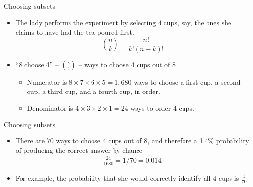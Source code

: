 \documentclass{beamer}
\begin{document}
\begin{frame}{Choosing subsets}
	
	\begin{itemize}
	\item The lady performs the experiment by selecting $4$ cups, say, the ones she claims to have had the tea poured first.
	 $${n \choose k} = \frac{n!}{k!(n-k)!}$$
	\item ``8 choose 4'' -- $ 8 \choose 4 $ -- ways to choose 4 cups out of 8
		
		\begin{itemize}
		\item Numerator is $8\times{7}\times{6}\times{5}=1,680$ ways to choose a first cup, a second cup, a third cup, and a fourth cup, in order.
		\item Denominator is $4\times{3}\times{2}\times{1}=24$ ways to order $4$ cups.
		\end{itemize}
	\end{itemize}
\end{frame}


\begin{frame}{Choosing subsets}

\begin{itemize}
	\item There are $70$ ways to choose $4$ cups out of $8$, and therefore a 1.4\% probability of producing the correct answer by chance
		\begin{eqnarray*}
		\frac{24}{1680}=1/70=0.014.
		\end{eqnarray*}
	\item For example, the probability that she would correctly identify all $4$ cups is $\frac{1}{70}$ 
\end{itemize}

\end{frame}



	
\end{document}
